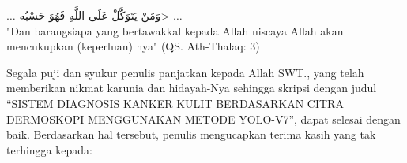 \documentclass[]{mathuinsa}
\begin{document}
    \cover\titlepage

    \approvalpageBeforeExam
    \approvalpage
    \declarepage


    \motto


    \begin{center}
        $\ldots$ \<وَمَنْ يَتَوَكَّلْ عَلَى اللَّهِ فَهُوَ حَسْبُه> $\ldots$ \\
        {"}Dan barangsiapa yang bertawakkal kepada Allah niscaya Allah akan mencukupkan (keperluan) nya{"}
        (QS. Ath-Thalaq: 3)
    \end{center}


    \acknowledment
    \begin{center}
        \emph{}
    \end{center}

    \preface
    Segala puji dan syukur penulis panjatkan kepada Allah SWT., yang telah memberikan nikmat karunia dan hidayah-Nya sehingga skripsi dengan judul “SISTEM DIAGNOSIS KANKER KULIT BERDASARKAN CITRA DERMOSKOPI MENGGUNAKAN METODE YOLO-V7”, dapat selesai dengan baik. Berdasarkan hal tersebut, penulis mengucapkan terima kasih yang tak terhingga kepada:
\end{document}
